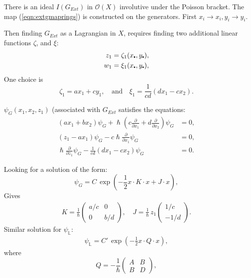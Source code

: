    
    \begin{frame}
    
    There is an ideal \(I(G_{Ext})\) in \(\mathcal{O}(X)\) involutive under the Poisson bracket. The map (\ref{eqn:extgmaprings}) is constructed on the generators. First 
    \( x_i  \rightarrow x_i ,
    y_i  \rightarrow y_i\).
    
    Then finding \(G_{Ext}\) as a Lagrangian in \(X\), requires finding two additional linear functions \(\zeta\), and \(\xi\):
    \begin{align}
    \label{eqn:solveforext}
    z_1 &= \zeta_1(x_{\sbt},y_{\sbt}), \\
    w_1 &= \xi_1(x_{\sbt},y_{\sbt}),
    \end{align}
    One choice is 
    \[\zeta_1 = a x_1 + c y_1, \quad  \text{and} \quad  \xi_1 = \frac{1}{cd} \left( d x_1 - c x_2 \right) .\]
    
    \end{frame}
    
    
    \begin{frame} \(\psi_G(x_1,x_2,z_1)\) (associated with \(G_{Ext}\) satisfies the equations: 
    \begin{align*}
       (a x_1 + b x_2) \psi_G + \hslash \left( c \frac{\partial}{\partial x_1 } +  d \frac{\partial}{\partial x_2} \right) \psi_G & = 0, \\
       ( z_1 - a x_1 ) \psi_G  - c \hslash \frac{\partial}{\partial x_1} \psi_G &= 0, \\ 
       \hslash \frac{\partial}{\partial z_1} \psi_G - \frac{1}{c d} ( d x_1 - c x_2) \psi_G &= 0.
    \end{align*}
    
    \end{frame}
    
    
    \begin{frame}
    Looking for a solution of the form:
    \[ \psi_G = C \,\exp\left( -\frac{1}{2} x \cdot K \cdot x  + J  \cdot x\right),\]
    Gives
    \begin{align*}
        K = \frac{1}{\hslash} \left(\begin{array}{cc}
            a/c & 0 \\
            0 & b/d
        \end{array}\right), \quad J = \frac{1}{\hslash} \,  z_1 \left( \begin{array}{c}
            1/c \\
            -1/d
        \end{array}\right).
    \end{align*}
    Similar solution for \( \psi_{\mathbb{L}}\):
    \begin{align*}
        \psi_{\mathbb{L}} =  C' \, \exp \left( -\frac{1}{2}   x \cdot Q \cdot  x \right),
    \end{align*}
    where 
    \[ Q = - \frac{1}{\hslash} \left( \begin{array}{cc}
        A  &  B \\
        B & D  
    \end{array}\right),\]
    \end{frame}
    
